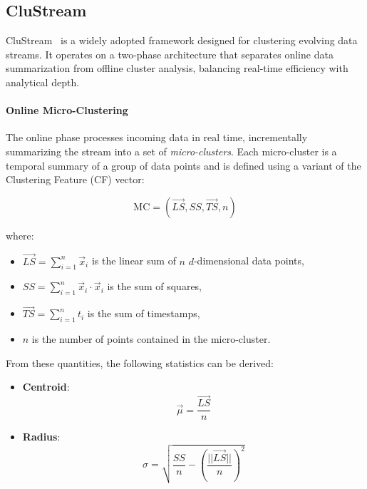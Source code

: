 \subsection{CluStream}\label{subsec:clustream}

CluStream~\cite{clustream} is a widely adopted framework designed for
clustering evolving data streams. It operates on a two-phase architecture that
separates online data summarization from offline cluster analysis, balancing
real-time efficiency with analytical depth.

\paragraph{Online Micro-Clustering} The online phase processes incoming data in real time, incrementally
summarizing the stream into a set of \textit{micro-clusters}. Each
micro-cluster is a temporal summary of a group of data points and is defined
using a variant of the Clustering Feature (CF) vector:

\begin{equation}
    \text{MC} = \left( \vec{LS}, SS, \vec{TS}, n \right)
\end{equation}

where:
\begin{itemize}
    \item $\vec{LS} = \sum_{i=1}^{n} \vec{x}_i$ is the linear sum of $n$ $d$-dimensional data points,
    \item $SS = \sum_{i=1}^{n} \vec{x}_i \cdot \vec{x}_i$ is the sum of squares,
    \item $\vec{TS} = \sum_{i=1}^{n} t_i$ is the sum of timestamps,
    \item $n$ is the number of points contained in the micro-cluster.
\end{itemize}

From these quantities, the following statistics can be derived:
\begin{itemize}
    \item \textbf{Centroid}:
          \begin{equation}
              \vec{\mu} = \frac{\vec{LS}}{n}
          \end{equation}
    \item \textbf{Radius}:
          \begin{equation}
              \sigma = \sqrt{ \frac{SS}{n} - \left( \frac{||\vec{LS}||}{n} \right)^2 }
          \end{equation}
\end{itemize}

